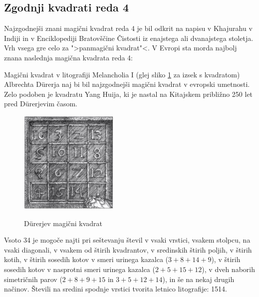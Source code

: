 \documentclass[a4paper,12pt]{article}
\begin{document}

\subsection{Zgodnji kvadrati reda 4}

Najzgodnejši znani magični kvadrat reda 4 je bil odkrit na napisu
v Khajurahu v Indiji in v Enciklopediji Bratovščine Čistosti iz enajstega
ali dvanajstega stoletja. Vrh vsega gre celo za ">panmagični kvadrat"<.
V Evropi sta morda najbolj znana naslednja magična kvadrata reda 4:

Magični kvadrat v litografiji Melancholia I (glej sliko \ref{fig:durer}
za izsek s kvadratom) Albrechta Dürerja naj bi bil najzgodnejši magični kvadrat
v evropski umetnosti. Zelo podoben je kvadratu Yang Huija, ki je nastal na Kitajskem
približno 250 let pred Dürerjevim časom. %
\begin{figure}[!ht]
   \centering
   \caption{Dürerjev magični kvadrat}
   \includegraphics[scale=1.3]{durer.png}
   \label{fig:durer}
\end{figure}


Vsoto 34 je mogoče najti pri seštevanju števil v vsaki vrstici, vsakem stolpcu,
na vsaki diagonali, v vsakem od štirih kvadrantov, v sredinskih štirih poljih,
v štirih kotih, v štirih sosedih kotov v smeri urinega kazalca ($3+8+14+9$), v
štirih sosedih kotov v nasprotni smeri urinega kazalca ($2+5+15+12$), v dveh naborih
simetričnih parov ($2+8+9+15$ in $3+5+12+14$), in še na nekaj drugih načinov.
Števili na sredini spodnje vrstici tvorita letnico litografije: 1514.
%
\end{document}
